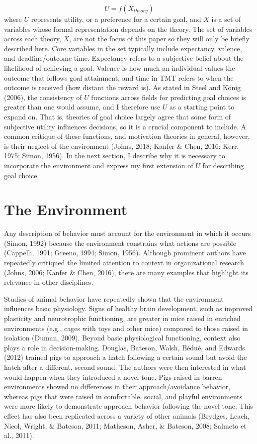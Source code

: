 \documentclass[english,,man]{apa6}
\theoremstyle{definition}
\theoremstyle{definition}
\theoremstyle{definition}
\theoremstyle{remark}
\begin{document}
\begin{equation}
U = f(X_{theory})
\end{equation} \noindent where \(U\) represents utility, or a preference
for a certain goal, and \(X\) is a set of variables whose formal
representation depends on the theory. The set of variables across each
theory, \(X\), are not the focus of this paper so they will only be
briefly described here. Core variables in the set typically include
expectancy, valence, and deadline/outcome time. Expectancy refers to a
subjective belief about the likelihood of achieving a goal. Valence is
how much an individual values the outcome that follows goal attainment,
and time in TMT refers to when the outcome is received (how distant the
reward is). As stated in Steel and König (2006), the consistency of
\(U\) functions across fields for predicting goal choices is greater
than one would assume, and I therefore use \(U\) as a starting point to
expand on. That is, theories of goal choice largely agree that some form
of subjective utility influences decisions, so it is a crucial component
to include. A common critique of these functions, and motivation
theories in general, however, is their neglect of the environment
(Johns, 2018; Kanfer \& Chen, 2016; Kerr, 1975; Simon, 1956). In the
next section, I describe why it is necessary to incorporate the
environment and express my first extension of \(U\) for describing goal
choice.

\hypertarget{the-environment}{%
\section{The Environment}\label{the-environment}}

Any description of behavior must account for the environment in which it
occurs (Simon, 1992) because the environment constrains what actions are
possible (Cappelli, 1991; Greeno, 1994; Simon, 1956). Although prominent
authors have repeatedly critiqued the limited attention to context in
organizational research (Johns, 2006; Kanfer \& Chen, 2016), there are
many examples that highlight its relevance in other disciplines.

Studies of animal behavior have repeatedly shown that the environment
influences basic physiology. Signs of healthy brain development, such as
improved plasticity and neurotrophic functioning, are greater in mice
raised in enriched environments (e.g., cages with toys and other mice)
compared to those raised in isolation (Duman, 2009). Beyond basic
physiological functioning, context also plays a role in decision-making.
Douglas, Bateson, Walsh, Bédué, and Edwards (2012) trained pigs to
approach a hatch following a certain sound but avoid the hatch after a
different, second sound. The authors were then interested in what would
happen when they introduced a novel tone. Pigs raised in barren
environments showed no differences in their approach/avoidance behavior,
whereas pigs that were raised in comfortable, social, and playful
environments were more likely to demonstrate approach behavior following
the novel tone. This effect has also been replicated across a variety of
other animals (Brydges, Leach, Nicol, Wright, \& Bateson, 2011;
Matheson, Asher, \& Bateson, 2008; Salmeto et al., 2011).
\end{document}
